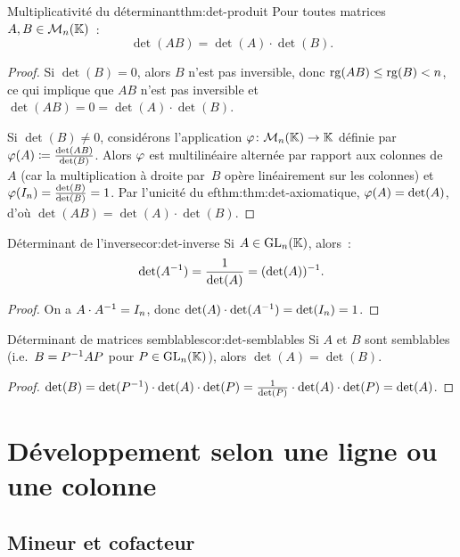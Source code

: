 \begin{theorem}{Multiplicativité du déterminant}{thm:det-produit}
  Pour toutes matrices $A,B\in\mathcal{M}_n({\mathbb{K}})$~:
  \[
    \det(AB)=\det(A)\cdot\det(B).
  \]
\end{theorem}

\begin{proof}
  Si $\det(B)=0$, alors $B$ n'est pas inversible, donc
  $\operatorname{rg}(AB)\leq\operatorname{rg}(B)<n$, ce qui implique que $AB$ n'est pas inversible
  et $\det(AB)=0=\det(A)\cdot\det(B)$.

  Si $\det(B)\neq 0$, considérons l'application
  $\varphi\colon\mathcal{M}_n({\mathbb{K}})\to{\mathbb{K}}$ définie par
  $\varphi(A)\coloneqq\frac{\det(AB)}{\det(B)}$.
  Alors $\varphi$ est multilinéaire alternée par rapport aux colonnes
  de~$A$ (car la multiplication à droite par~$B$ opère linéairement sur
  les colonnes) et $\varphi(I_n)=\frac{\det(B)}{\det(B)}=1$.
  Par l'unicité du 
ef{thm:thm:det-axiomatique}, $\varphi(A)=\det(A)$,
  d'où $\det(AB)=\det(A)\cdot\det(B)$.
\end{proof}

\begin{corollary}{Déterminant de l'inverse}{cor:det-inverse}
  Si $A\in\operatorname{GL}_n({\mathbb{K}})$, alors~:
  \[
    \det({A}^{-1})=\frac{1}{\det(A)}=(\det(A))^{-1}.
  \]
\end{corollary}

\begin{proof}
  On a $A\cdot{A}^{-1}=I_n$, donc
  $\det(A)\cdot\det({A}^{-1})=\det(I_n)=1$.
\end{proof}

\begin{corollary}{Déterminant de matrices semblables}{cor:det-semblables}
  Si $A$ et $B$ sont semblables (i.e.\ $B={P}^{-1}AP$ pour
  $P\in\operatorname{GL}_n({\mathbb{K}})$), alors $\det(A)=\det(B)$.
\end{corollary}

\begin{proof}
  $\det(B)=\det({P}^{-1})\cdot\det(A)\cdot\det(P)
  =\frac{1}{\det(P)}\cdot\det(A)\cdot\det(P)=\det(A)$.
\end{proof}

\section{Développement selon une ligne ou une colonne}%
\label{sec:developpement-laplace}

\subsection{Mineur et cofacteur}\label{subsec:mineur-cofacteur}

